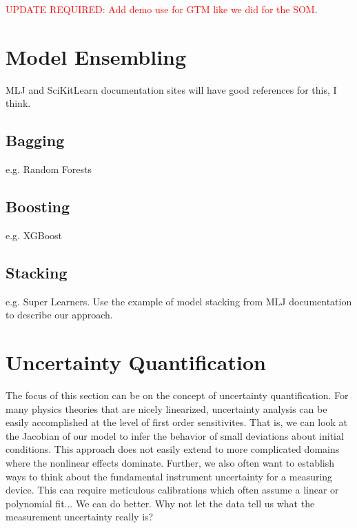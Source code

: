 \textcolor{red}{UPDATE REQUIRED: Add demo use for GTM like we did for the SOM}.





\section{Model Ensembling}
MLJ and SciKitLearn documentation sites will have good references for this, I think.
\subsection{Bagging}
e.g. Random Forests
\subsection{Boosting}
e.g. XGBoost
\subsection{Stacking}
e.g. Super Learners. Use the example of model stacking from MLJ documentation to describe our approach.




\section{Uncertainty Quantification}
The focus of this section can be on the concept of uncertainty quantification. For many physics theories that are nicely linearized, uncertainty analysis can be easily accomplished at the level of first order sensitivites. That is, we can look at the Jacobian of our model to infer the behavior of small deviations about initial conditions. This approach does not easily extend to more complicated domains where the nonlinear effects dominate. Further, we also often want to establish ways to think about the fundamental instrument uncertainty for a measuring device. This can require meticulous calibrations which often assume a linear or polynomial fit... We can do better. Why not let the data tell us what the measurement uncertainty really is?

